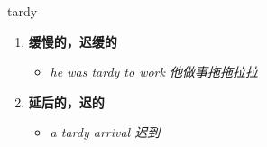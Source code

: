 
\begin{frame}
{\huge tardy}
\begin{center}
\begin{enumerate}\Large
  \item \textbf{缓慢的，迟缓的}
  \begin{itemize}
    \item \em{\Large{he was tardy to work 他做事拖拖拉拉}}
  \end{itemize}
  \item \textbf{延后的，迟的}
  \begin{itemize}
    \item \em{\Large{a tardy arrival 迟到}}
  \end{itemize}
\end{enumerate}
\end{center}
\end{frame}

